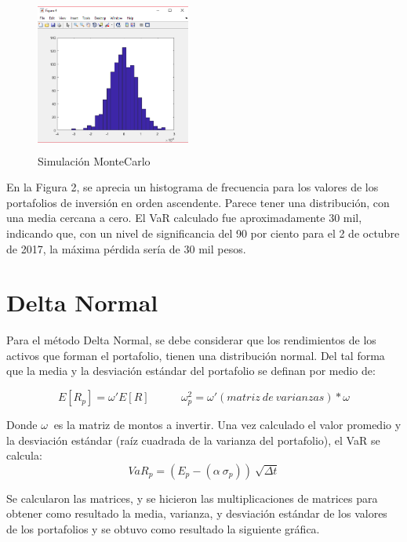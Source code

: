 \documentclass[12pt]{article}
\begin{document}
\begin{figure}[h]
\begin{minipage}{7in}
\begin{center}
\includegraphics[width=2in,height=2in]{montecarlo.PNG}
\caption{Simulación MonteCarlo} 
\label{Figure 2} 
\end{center}
\end{minipage}
\end{figure}

En la Figura 2, se aprecia un histograma de frecuencia para los valores de los portafolios de inversión en orden ascendente. Parece tener una distribución, con una media cercana a cero. El VaR calculado fue aproximadamente 30 mil, indicando que, con un nivel de significancia del 90 por ciento para el 2 de octubre de 2017, la máxima pérdida sería de 30 mil pesos.
\newpage
\section{Delta Normal}
Para el método Delta Normal, se debe considerar que los rendimientos de los activos que forman el portafolio, tienen una distribución normal. Del tal forma que la media y la desviación estándar del portafolio se definan por medio de:

$$E[R_{p}] = \omega ' E[R] \: \: \: \: \: \: \: \: \: \: \:\: \: \omega_{p}^2 = \omega ' (matriz\:de\:varianzas) * \omega$$ \: \: \: \: 

Donde $ \omega\:$ es la matriz de montos a invertir. Una vez calculado el valor promedio y la desviación estándar (raíz cuadrada de la varianza del portafolio), el VaR se calcula:
$$ VaR_{p} = (E_{p}-(\alpha \:\sigma_{p}))\:\sqrt{\Delta t}$$

Se calcularon las matrices, y se hicieron las multiplicaciones de matrices para obtener como resultado la media, varianza, y desviación estándar de los valores de los portafolios y se obtuvo como resultado la siguiente gráfica.
\end{document}
